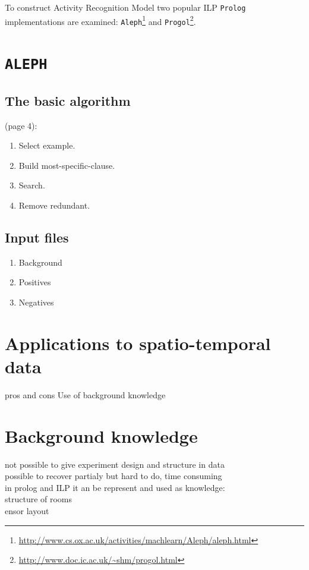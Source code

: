 \documentclass[12pt, a4paper, pdflatex, leqno, twoside, openright]{report}
\begin{document}
To construct Activity Recognition Model two popular ILP \texttt{Prolog} implementations are examined: \texttt{Aleph}\footnote{\url{http://www.cs.ox.ac.uk/activities/machlearn/Aleph/aleph.html}} and \texttt{Progol}\footnote{\url{http://www.doc.ic.ac.uk/~shm/progol.html}}.

  \section{\texttt{ALEPH}}
    \subsection{The basic algorithm}
(page 4):
\begin{enumerate}
  \item Select example.
  \item Build most-specific-clause.
  \item Search.
  \item Remove redundant.
\end{enumerate}

    \subsection{Input files}
\begin{enumerate}
  \item Background
  \item Positives
  \item Negatives
\end{enumerate}


  \section{Applications to spatio-temporal data}
pros and cons Use of background knowledge

  \section{Background knowledge}
not possible to give experiment design and structure in data\\
possible to recover partialy but hard to do, time consuming\\

in prolog and ILP it an be represent and used as knowledge:\\
structure of rooms\\
ensor layout\\
\end{document}
